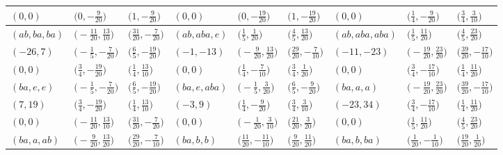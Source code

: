 \documentclass[pdftex]{sigma}
\theoremstyle{definition}
\numberwithin{equation}{section}
\begin{document}
\begin{landscape}
\begin{table}[th]
\begin{tabular}{|lll|lll|lll|}
\\
$(0, 0)$ & $\bigl(0, -\frac{9}{20}\bigr)$ & $\bigl(1, -\frac{9}{20}\bigr)$ & $(0, 0)$ & $\bigl(0, -\frac{19}{20}\bigr)$ & $\bigl(1, -\frac{19}{20}\bigr)$ & $(0, 0)$ & $\bigl(\frac{1}{4}, -\frac{9}{20}\bigr)$ & $\bigl(\frac{3}{4}, \frac{3}{10}\bigr)$
\\\hline
$(ab, ba, ba)$ & $\bigl(-\frac{11}{20}, \frac{13}{10}\bigr)$ & $\bigl(\frac{31}{20}, -\frac{7}{20}\bigr)$ & $(ab, aba, e)$ & $\bigl(\frac{1}{5}, \frac{1}{20}\bigr)$ & $\bigl(\frac{4}{5}, \frac{13}{20}\bigr)$ & $(ab, aba, aba)$ & $\bigl(\frac{1}{5}, \frac{11}{20}\bigr)$ & $\bigl(\frac{4}{5}, \frac{23}{20}\bigr)$
\\
$(-26, 7)$ & $\bigl(-\frac{1}{5}, -\frac{7}{20}\bigr)$ & $\bigl(\frac{6}{5}, -\frac{19}{20}\bigr)$ & $(-1, -13)$ & $\bigl(-\frac{9}{20}, \frac{13}{20}\bigr)$ & $\bigl(\frac{29}{20}, -\frac{7}{10}\bigr)$ & $(-11, -23)$ & $\bigl(-\frac{19}{20}, \frac{23}{20}\bigr)$ & $\bigl(\frac{39}{20}, -\frac{17}{10}\bigr)$
\\
$(0, 0)$ & $\bigl(\frac{3}{4}, -\frac{19}{20}\bigr)$ & $\bigl(\frac{1}{4}, \frac{13}{10}\bigr)$ & $(0, 0)$ & $\bigl(\frac{1}{4}, -\frac{7}{10}\bigr)$ & $\bigl(\frac{3}{4}, \frac{1}{20}\bigr)$ & $(0, 0)$ & $\bigl(\frac{3}{4}, -\frac{17}{10}\bigr)$ & $\bigl(\frac{1}{4}, \frac{11}{20}\bigr)$
\\\hline
$(ba, e, e)$ & $\bigl(-\frac{1}{5}, -\frac{7}{20}\bigr)$ & $\bigl(\frac{6}{5}, -\frac{19}{20}\bigr)$ & $(ba, e, aba)$ & $\bigl(-\frac{1}{5}, \frac{3}{20}\bigr)$ & $\bigl(\frac{6}{5}, -\frac{9}{20}\bigr)$ & $(ba, a, a)$ & $\bigl(-\frac{19}{20}, \frac{23}{20}\bigr)$ & $\bigl(\frac{39}{20}, -\frac{17}{10}\bigr)$
\\
$(7, 19)$ & $\bigl(\frac{3}{4}, -\frac{19}{20}\bigr)$ & $\bigl(\frac{1}{4}, \frac{13}{10}\bigr)$ & $(-3, 9)$ & $\bigl(\frac{1}{4}, -\frac{9}{20}\bigr)$ & $\bigl(\frac{3}{4}, \frac{3}{10}\bigr)$ & $(-23, 34)$ & $\bigl(\frac{3}{4}, -\frac{17}{10}\bigr)$ & $\bigl(\frac{1}{4}, \frac{11}{20}\bigr)$
\\
$(0, 0)$ & $\bigl(-\frac{11}{20}, \frac{13}{10}\bigr)$ & $\bigl(\frac{31}{20}, -\frac{7}{20}\bigr)$ & $(0, 0)$ & $\bigl(-\frac{1}{20}, \frac{3}{10}\bigr)$ & $\bigl(\frac{21}{20}, \frac{3}{20}\bigr)$ & $(0, 0)$ & $\bigl(\frac{1}{5}, \frac{11}{20}\bigr)$ & $\bigl(\frac{4}{5}, \frac{23}{20}\bigr)$
\\\hline
$(ba, a, ab)$ & $\bigl(-\frac{9}{20}, \frac{13}{20}\bigr)$ & $\bigl(\frac{29}{20}, -\frac{7}{10}\bigr)$ & $(ba, b, b)$ & $\bigl(\frac{11}{20}, -\frac{11}{10}\bigr)$ & $\bigl(\frac{9}{20}, \frac{11}{20}\bigr)$ & $(ba, b, ba)$ & $\bigl(\frac{1}{20}, -\frac{1}{10}\bigr)$ & $\bigl(\frac{19}{20}, \frac{1}{20}\bigr)$

\end{tabular}
\end{table}
\end{landscape}
\end{document}
